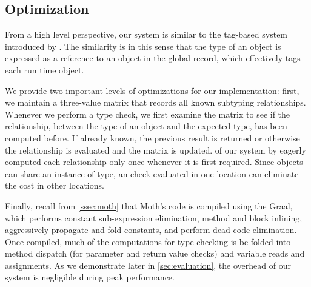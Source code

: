 \subsection{Optimization}
\label{ssec:optimization}

From a high level perspective, 
our system is similar to the tag-based system introduced by \citet{Greenman2018}.
The similarity is in this sense that the type of an object is expressed as a reference
to an object in the global record, which
effectively tags each run time object.

We provide two important levels of optimizations for our implementation: 
first, we maintain a three-value matrix that records all known subtyping relationships. 
Whenever we perform a type check, we first examine the matrix to see if the relationship, 
between the type of an object and the expected type, has been computed before.
If already known, the previous result is returned 
or otherwise the relationship is evaluated and the matrix is updated.
 of our system 
by eagerly computed each relationship only once whenever it is first required.
Since objects can share an instance of type,
an check evaluated in one location can eliminate the cost in other locations.

Finally, recall from \cref{ssec:moth} that
Moth's code is compiled using the Graal, 
which performs
constant sub-expression elimination,
method and block inlining,
aggressively propagate and fold constants, and
perform dead code elimination.
Once compiled, much of the computations for type checking
is be folded into method dispatch
(for parameter and return value checks)
and variable reads and assignments.
As we demonstrate later in \cref{sec:evaluation}, 
the overhead of our system is negligible during peak performance.
